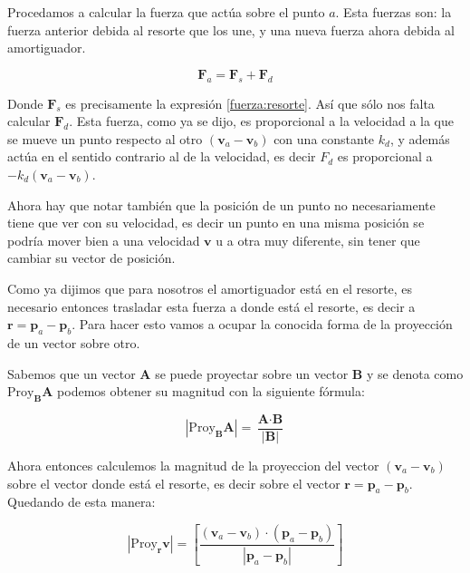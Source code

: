 Procedamos a calcular la fuerza que actúa sobre el punto $a$.
Esta fuerzas son: la fuerza anterior debida al resorte que los une, y una nueva fuerza ahora debida al amortiguador.

\begin{equation}
\textbf{F}_a = \textbf{F}_s + \textbf{F}_d
\end{equation}

Donde $\textbf{F}_s$ es precisamente la expresión \ref{fuerza:resorte}. Así que sólo nos falta calcular $\textbf{F}_d$.
Esta fuerza, como ya se dijo, es proporcional a la velocidad a la que se mueve un punto respecto al otro $\left( \textbf{v}_a - \textbf{v}_b \right)$ con una constante $k_d$, y además actúa en el sentido contrario al de la velocidad, es decir $F_d$ es proporcional a $-k_d \left( \textbf{v}_a - \textbf{v}_b \right)$.


Ahora hay que notar también que la posición de un punto no necesariamente tiene que ver con su velocidad, es decir un punto en una misma posición se podría mover bien a una velocidad $\textbf{v}$ u a otra muy diferente, sin tener que cambiar su vector de posición.

Como ya dijimos que para nosotros el amortiguador está en el resorte, es necesario entonces trasladar esta fuerza a donde está el resorte, es decir a $\textbf{r} = \textbf{p}_a - \textbf{p}_b$.
Para hacer esto vamos a ocupar la conocida forma de la proyección de un vector sobre otro.

Sabemos que un vector $\textbf{A}$ se puede proyectar sobre un vector $\textbf{B}$ y se denota como $\mathrm{Proy}_{ \textbf{B} } \textbf{A}$ podemos obtener su magnitud con la siguiente fórmula:

\begin{equation}
| \mathrm{Proy}_{\textbf{B}} \textbf{A} | = \frac{ \textbf{A} \cdot \textbf{B} }{| \textbf{B} |}
\end{equation}

Ahora entonces calculemos la magnitud de la proyeccion del vector $\left( \textbf{v}_a - \textbf{v}_b \right)$ sobre el vector donde está el resorte, es decir sobre el vector $\textbf{r} = \textbf{p}_a - \textbf{p}_b$.
Quedando de esta manera:

\begin{equation}
 | \mathrm{Proy}_{ \textbf{r} } \textbf{v} | = \left[ \frac{ ( \textbf{v}_a - \textbf{v}_b ) \cdot ( \textbf{p}_a - \textbf{p}_b ) }{ | \textbf{p}_a - \textbf{p}_b | } \right]
\end{equation}

